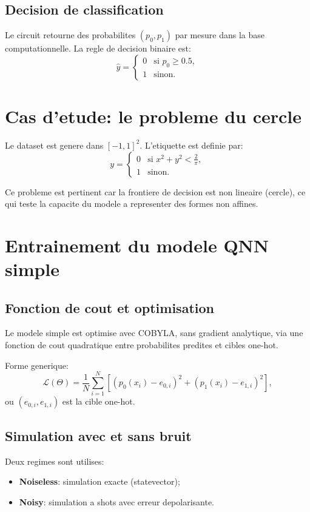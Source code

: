 \documentclass[11pt,a4paper]{article}
\begin{document}
\subsection{Decision de classification}
Le circuit retourne des probabilites $(p_0, p_1)$ par mesure dans la base computationnelle. La regle de decision binaire est:
\[
\hat y =
\begin{cases}
0 & \text{si } p_0 \ge 0.5,\\
1 & \text{sinon.}
\end{cases}
\]

\section{Cas d'etude: le probleme du cercle}
Le dataset est genere dans $[-1,1]^2$. L'etiquette est definie par:
\[
y =
\begin{cases}
0 & \text{si } x^2 + y^2 < \frac{2}{\pi},\\
1 & \text{sinon.}
\end{cases}
\]

Ce probleme est pertinent car la frontiere de decision est non lineaire (cercle), ce qui teste la capacite du modele a representer des formes non affines.

\section{Entrainement du modele QNN simple}
\subsection{Fonction de cout et optimisation}
Le modele simple est optimise avec COBYLA, sans gradient analytique, via une fonction de cout quadratique entre probabilites predites et cibles one-hot.

Forme generique:
\[
\mathcal{L}(\Theta) = \frac{1}{N}\sum_{i=1}^N \left[(p_0(x_i)-e_{0,i})^2 + (p_1(x_i)-e_{1,i})^2\right],
\]
ou $(e_{0,i}, e_{1,i})$ est la cible one-hot.

\subsection{Simulation avec et sans bruit}
Deux regimes sont utilises:
\begin{itemize}
  \item \textbf{Noiseless}: simulation exacte (statevector);
  \item \textbf{Noisy}: simulation a shots avec erreur depolarisante.
\end{itemize}
\end{document}
